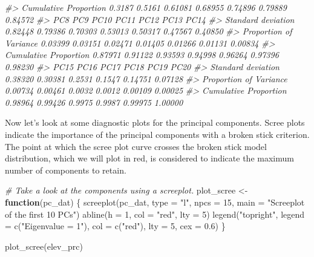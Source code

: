 \documentclass[
]{article}
\newenvironment{Shaded}{\begin{snugshade}}{\end{snugshade}}
\newcommand{\AttributeTok}[1]{\textcolor[rgb]{0.77,0.63,0.00}{#1}}
\newcommand{\CommentTok}[1]{\textcolor[rgb]{0.56,0.35,0.01}{\textit{#1}}}
\newcommand{\ControlFlowTok}[1]{\textcolor[rgb]{0.13,0.29,0.53}{\textbf{#1}}}
\newcommand{\DecValTok}[1]{\textcolor[rgb]{0.00,0.00,0.81}{#1}}
\newcommand{\FloatTok}[1]{\textcolor[rgb]{0.00,0.00,0.81}{#1}}
\newcommand{\FunctionTok}[1]{\textcolor[rgb]{0.00,0.00,0.00}{#1}}
\newcommand{\NormalTok}[1]{#1}
\newcommand{\OtherTok}[1]{\textcolor[rgb]{0.56,0.35,0.01}{#1}}
\newcommand{\StringTok}[1]{\textcolor[rgb]{0.31,0.60,0.02}{#1}}
\begin{document}
\begin{Shaded}
\begin{Highlighting}[]
\CommentTok{\#\textgreater{} Cumulative Proportion  0.3187 0.5161 0.61081 0.68955 0.74896 0.79889 0.84572}
\CommentTok{\#\textgreater{}                            PC8     PC9    PC10    PC11    PC12    PC13    PC14}
\CommentTok{\#\textgreater{} Standard deviation     0.82448 0.79386 0.70303 0.53013 0.50317 0.47567 0.40850}
\CommentTok{\#\textgreater{} Proportion of Variance 0.03399 0.03151 0.02471 0.01405 0.01266 0.01131 0.00834}
\CommentTok{\#\textgreater{} Cumulative Proportion  0.87971 0.91122 0.93593 0.94998 0.96264 0.97396 0.98230}
\CommentTok{\#\textgreater{}                           PC15    PC16   PC17   PC18    PC19    PC20}
\CommentTok{\#\textgreater{} Standard deviation     0.38320 0.30381 0.2531 0.1547 0.14751 0.07128}
\CommentTok{\#\textgreater{} Proportion of Variance 0.00734 0.00461 0.0032 0.0012 0.00109 0.00025}
\CommentTok{\#\textgreater{} Cumulative Proportion  0.98964 0.99426 0.9975 0.9987 0.99975 1.00000}
\end{Highlighting}
\end{Shaded}

Now let's look at some diagnostic plots for the principal components.
Scree plots indicate the importance of the principal components with a
broken stick criterion. The point at which the scree plot curve crosses
the broken stick model distribution, which we will plot in red, is
considered to indicate the maximum number of components to retain.

\begin{Shaded}
\begin{Highlighting}[]
\CommentTok{\# Take a look at the components using a screeplot.}
\NormalTok{plot\_scree }\OtherTok{\textless{}{-}} \ControlFlowTok{function}\NormalTok{(pc\_dat) \{}
  \FunctionTok{screeplot}\NormalTok{(pc\_dat, }\AttributeTok{type =} \StringTok{"l"}\NormalTok{, }\AttributeTok{npcs =} \DecValTok{15}\NormalTok{, }
            \AttributeTok{main =} \StringTok{"Screeplot of the first 10 PCs"}\NormalTok{)}
  \FunctionTok{abline}\NormalTok{(}\AttributeTok{h =} \DecValTok{1}\NormalTok{, }\AttributeTok{col =} \StringTok{"red"}\NormalTok{, }\AttributeTok{lty =} \DecValTok{5}\NormalTok{)}
  \FunctionTok{legend}\NormalTok{(}\StringTok{"topright"}\NormalTok{, }\AttributeTok{legend =} \FunctionTok{c}\NormalTok{(}\StringTok{"Eigenvalue = 1"}\NormalTok{),}
         \AttributeTok{col =} \FunctionTok{c}\NormalTok{(}\StringTok{"red"}\NormalTok{), }\AttributeTok{lty =} \DecValTok{5}\NormalTok{, }\AttributeTok{cex =} \FloatTok{0.6}\NormalTok{)}
\NormalTok{\}}

\FunctionTok{plot\_scree}\NormalTok{(elev\_prc)}
\end{Highlighting}
\end{Shaded}
\end{document}
